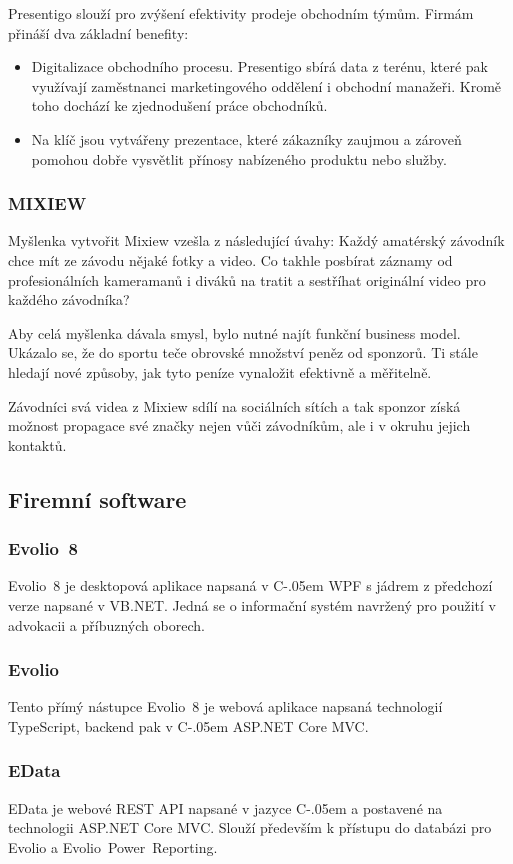 \documentclass[czech,bachelor,dept460,male,csharp]{diploma}
\newcommand{\EvolioEight}{Evolio~8}
\newcommand{\EFilters}{Evolio~Power~Reporting}
\newcommand{\EvolioX}{Evolio}
\newcommand{\EData}{EData}
\newcommand{\Csharp}{%
  {\settoheight{\dimen0}{C}C\kern-.05em \resizebox{!}{\dimen0}{\raisebox{\depth}{\#}}}}
\begin{document}
		Presentigo slouží pro zvýšení efektivity prodeje obchodním týmům. Firmám přináší dva základní benefity:
		\begin{itemize}
			\item
			Digitalizace obchodního procesu. Presentigo sbírá data z terénu, které pak využívají zaměstnanci marketingového oddělení i obchodní manažeři. Kromě toho dochází ke zjednodušení práce obchodníků.
			\item
			Na klíč jsou vytvářeny prezentace, které zákazníky zaujmou a zároveň pomohou dobře vysvětlit přínosy nabízeného produktu nebo služby.
		\end{itemize}

 		\subsubsection{MIXIEW}
 		Myšlenka vytvořit Mixiew vzešla z následující úvahy: Každý amatérský závodník chce mít ze závodu nějaké fotky a video. Co takhle posbírat záznamy od profesionálních kameramanů i diváků na tratit a sestříhat originální video pro každého závodníka?

		Aby celá myšlenka dávala smysl, bylo nutné najít funkční business model. Ukázalo se, že do sportu teče obrovské množství peněz od sponzorů. Ti stále hledají nové způsoby, jak tyto peníze vynaložit efektivně a měřitelně.

		Závodníci svá videa z Mixiew sdílí na sociálních sítích a tak sponzor získá možnost propagace své značky nejen vůči závodníkům, ale i v okruhu jejich kontaktů.
	\subsection{Firemní software}
		\subsubsection{\EvolioEight}
		{\EvolioEight} je desktopová aplikace napsaná v {\Csharp} WPF s jádrem z předchozí verze napsané v VB.NET. Jedná se o informační systém navržený pro použití v advokacii a příbuzných oborech. 
		\subsubsection{\EvolioX}
		Tento přímý nástupce {\EvolioEight} je webová aplikace napsaná technologií TypeScript, backend pak v {\Csharp} ASP.NET Core MVC.
		\subsubsection{\EData}
		{\EData} je webové REST API napsané v jazyce {\Csharp} a postavené na technologii ASP.NET Core MVC.
		Slouží především k přístupu do databázi pro {\EvolioX} a {\EFilters}.
\end{document}
